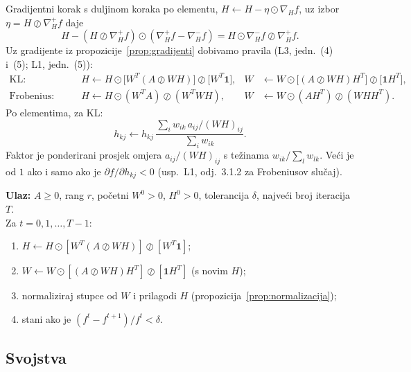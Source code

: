 \documentclass[11pt,a4paper]{article}
\theoremstyle{definition}
\theoremstyle{plain}
\theoremstyle{remark}
\newcommand{\one}{\mathbf{1}}
\begin{document}
Gradijentni korak s duljinom koraka po elementu, $H\leftarrow H-\eta\odot\nabla_Hf$, uz izbor
$\eta=H\oslash\nabla_H^+f$ daje
\[
  H-(H\oslash\nabla_H^+f)\odot(\nabla_H^+f-\nabla_H^-f)=H\odot\nabla_H^-f\oslash\nabla_H^+f.
\]
Uz gradijente iz propozicije~\ref{prop:gradijenti} dobivamo pravila (L3, jedn.~(4) i~(5); L1,
jedn.~(5)):
\begin{align*}
  \text{KL:}\qquad & H\leftarrow H\odot\bigl[W^T(A\oslash WH)\bigr]\oslash\bigl[W^T\one\bigr], &
  W&\leftarrow W\odot\bigl[(A\oslash WH)H^T\bigr]\oslash\bigl[\one H^T\bigr],\\
  \text{Frobenius:}\qquad & H\leftarrow H\odot(W^TA)\oslash(W^TWH), &
  W&\leftarrow W\odot(AH^T)\oslash(WHH^T).
\end{align*}
Po elementima, za KL:
\[
  h_{kj}\leftarrow h_{kj}\,\frac{\sum_iw_{ik}\,a_{ij}/(WH)_{ij}}{\sum_iw_{ik}}.
\]
Faktor je ponderirani prosjek omjera $a_{ij}/(WH)_{ij}$ s težinama $w_{ik}/\sum_lw_{lk}$. Veći je od
$1$ ako i samo ako je $\partial f/\partial h_{kj}<0$ (usp.\ L1, odj.~3.1.2 za Frobeniusov slučaj).

\begin{ukratko}
\textbf{Ulaz:} $A\geq0$, rang $r$, početni $W^0>0$, $H^0>0$, tolerancija $\delta$, najveći broj
iteracija $T$.\\
Za $t=0,1,\dots,T-1$:
\begin{enumerate}
\item $H\leftarrow H\odot[W^T(A\oslash WH)]\oslash[W^T\one]$;
\item $W\leftarrow W\odot[(A\oslash WH)H^T]\oslash[\one H^T]$ (s novim $H$);
\item normaliziraj stupce od $W$ i prilagodi $H$ (propozicija~\ref{prop:normalizacija});
\item stani ako je $(f^t-f^{t+1})/f^t<\delta$.
\end{enumerate}
\end{ukratko}

\subsection{Svojstva}
\end{document}

